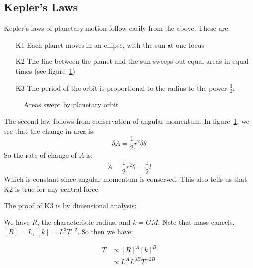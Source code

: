 \documentclass[../Main.tex]{subfiles}
\begin{document}
\subsection{Kepler's Laws}
Kepler's laws of planetary motion follow easily from the above. These are:
\begin{enumerate}
    \item[K1] Each planet moves in an ellipse, with the sun at one focus
    \item[K2] The line between the planet and the sun sweeps out equal areas in equal times (see figure~\ref{figOrbitAreas})
    \item[K3] The period of the orbit is proportional to the radius to the power $\frac{3}{2}$.
\end{enumerate}
\begin{figure}[ht]
    \centering
    \caption{Areas swept by planetary orbit}
    \label{figOrbitAreas}
\end{figure}
The second law follows from conservation of angular momentum. In figure~\ref{figOrbitAreas}, we see that the change in area is:
\begin{equation*}
    \delta A = \frac{1}{2} r^2 \delta \theta
\end{equation*}
So the rate of change of $A$ is:
\begin{equation*}
    \dot{A} = \frac{1}{2} r^2 \dot{\theta} = \frac{1}{2}l
\end{equation*}
Which is constant since angular momentum is conserved. This also tells us that K2 is true for any central force.\par
The proof of K3 is by dimensional analysis:\par
We have $R$, the characteristic radius, and $k = GM$. Note that mass cancels. $[R] = L$, $[k] = L^3T^{-2}$. So then we have:\par
\begin{align*}
    T &\propto [R]^A [k]^B \\
    &\propto L^A L^{3B} T^{-2B}
\end{align*}
\end{document}
